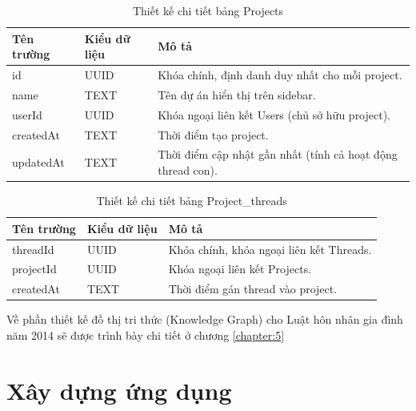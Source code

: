 \documentclass[../DoAn.tex]{subfiles}
\begin{document}
\begin{table}[H]
\centering
\begin{tabular}{|l|l|p{8cm}|}
\hline
\textbf{Tên trường} & \textbf{Kiểu dữ liệu} & \textbf{Mô tả} \\ \hline
id & UUID & Khóa chính, định danh duy nhất cho mỗi project. \\ \hline
name & TEXT & Tên dự án hiển thị trên sidebar. \\ \hline
userId & UUID & Khóa ngoại liên kết Users (chủ sở hữu project). \\ \hline
createdAt & TEXT & Thời điểm tạo project. \\ \hline
updatedAt & TEXT & Thời điểm cập nhật gần nhất (tính cả hoạt động thread con). \\ \hline
\end{tabular}
\caption{Thiết kế chi tiết bảng Projects}
\label{table:db_projects}
\end{table}

\begin{table}[H]
\centering
\begin{tabular}{|l|l|p{8cm}|}
\hline
\textbf{Tên trường} & \textbf{Kiểu dữ liệu} & \textbf{Mô tả} \\ \hline
threadId & UUID & Khóa chính, khóa ngoại liên kết Threads. \\ \hline
projectId & UUID & Khóa ngoại liên kết Projects. \\ \hline
createdAt & TEXT & Thời điểm gán thread vào project. \\ \hline
\end{tabular}
\caption{Thiết kế chi tiết bảng Project\_threads}
\label{table:db_project_threads}
\end{table}

Về phần thiết kế đồ thị tri thức (Knowledge Graph) cho Luật hôn nhân gia đình năm 2014 sẽ được trình bày chi tiết ở chương \ref{chapter:5}

\section{Xây dựng ứng dụng}
\end{document}
